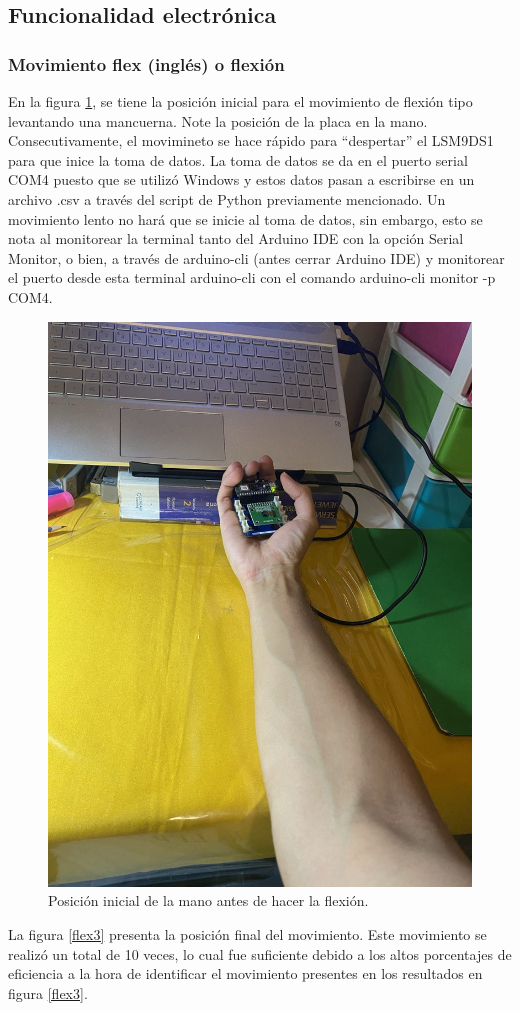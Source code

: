     


\subsection{Funcionalidad electrónica}

\subsubsection{Movimiento flex (inglés) o flexión}

En la figura \ref{flex1}, se tiene la posición inicial para el movimiento de flexión tipo levantando una mancuerna. Note la posición de la placa en la mano. Consecutivamente, el movimineto se hace rápido para  ``despertar'' el LSM9DS1 para que inice la toma de datos. La toma de datos se da en el puerto serial COM4 puesto que se utilizó Windows y estos datos pasan a escribirse en un archivo .csv a través del script de Python previamente mencionado. Un movimiento lento no hará que se inicie al toma de datos, sin embargo, esto se nota al monitorear la terminal tanto del Arduino IDE con la opción Serial Monitor, o bien, a través de arduino-cli (antes cerrar Arduino IDE) y monitorear el puerto desde esta terminal arduino-cli con el comando arduino-cli monitor -p COM4.

    \begin{figure}[H]
        \centering
        \includegraphics[width=0.5\linewidth]{pics/flex1.jpg}
        \caption{Posición inicial de la mano antes de hacer la flexión.}
        \label{flex1}
    \end{figure}
    
La figura \ref{flex3} presenta la posición final del movimiento. Este movimiento se realizó un total de 10 veces, lo cual fue suficiente debido a los altos porcentajes de eficiencia a la hora de identificar el movimiento presentes en los resultados en figura \ref{flex3}.

